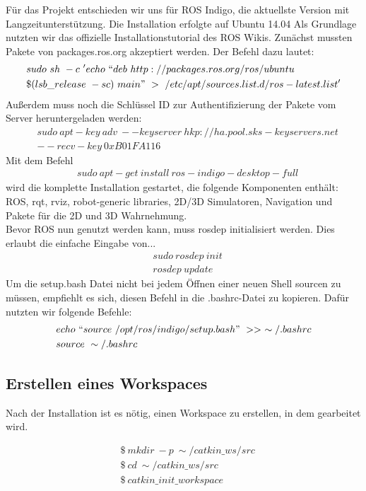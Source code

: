 \documentclass{scrartcl}
\begin{document}
Für das Projekt entschieden wir uns für ROS Indigo, die aktuellste Version mit Langzeitunterstützung.
Die Installation erfolgte auf Ubuntu 14.04 
Als Grundlage nutzten wir das offizielle Installationstutorial des ROS Wikis.
Zunächst mussten Pakete von packages.ros.org akzeptiert werden. Der Befehl dazu lautet: 
\begin{align}
&sudo\ sh\ -c\ 'echo\ ``deb\ http://packages.ros.org/ros/ubuntu \\ 
&\$(lsb\_release\ -sc)\ main"\ >\ /etc/apt/sources.list.d/ros-latest.list'
\end{align}
Außerdem muss noch die Schlüssel ID  zur Authentifizierung der Pakete vom Server heruntergeladen werden:
\begin{align}
&sudo\ apt-key\ adv\ --keyserver\ hkp://ha.pool.sks-keyservers.net\\ 
& --recv-key\ 0xB01FA116
\end{align}
Mit dem Befehl 
\begin{align}
&sudo\ apt-get\ install\ ros-indigo-desktop-full
\end{align}
wird die komplette Installation gestartet, die folgende Komponenten enthält: ROS, rqt, rviz, robot-generic libraries, 2D/3D Simulatoren, Navigation und Pakete für die 2D und 3D Wahrnehmung.
\\
Bevor ROS nun genutzt werden kann, muss rosdep initialisiert werden. Dies erlaubt die einfache Eingabe von...
\begin{align}
&sudo\ rosdep\ init\\
&rosdep\ update
\end{align}
Um die setup.bash Datei nicht bei jedem Öffnen einer neuen Shell sourcen zu müssen, empfiehlt es sich, diesen Befehl in die .bashrc-Datei zu kopieren.
Dafür nutzten wir folgende Befehle:
\begin{align}
&echo\ ``source\ /opt/ros/indigo/setup.bash"\ >>\ \sim/.bashrc\\
&source\ \sim/.bashrc
\end{align}

\subsection{Erstellen eines Workspaces}

Nach der Installation ist es nötig, einen Workspace zu erstellen, in dem gearbeitet wird.

\begin{align}
&\$\ mkdir\ -p\ \sim/catkin\_ws/src\\
&\$\ cd\ \sim/catkin\_ws/src\\
&\$\ catkin\_init\_workspace
\end{align}
\end{document}
